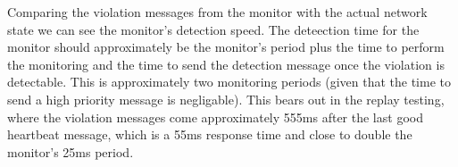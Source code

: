 Comparing the violation messages from the monitor with the actual network state we can see the monitor's detection speed. 
The deteection time for the monitor should approximately be the monitor's period plus the time to perform the monitoring and the time to send the detection message once the violation is detectable. 
This is approximately two monitoring periods (given that the time to send a high priority message is negligable). This bears out in the replay testing, where the violation messages come approximately 555ms after the last good heartbeat message, which is a 55ms response time and close to double the monitor's 25ms period.



